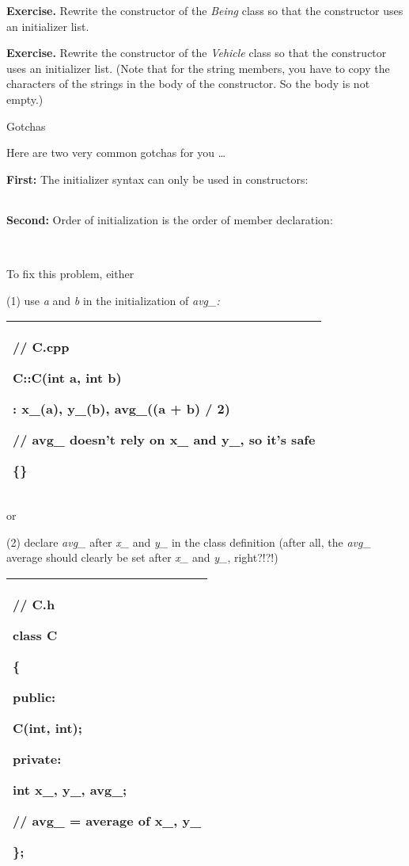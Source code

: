 \documentclass[
]{article}
\begin{document}
\textbf{Exercise.} Rewrite the constructor of the \emph{Being} class so
that the constructor uses an initializer list.

\textbf{Exercise.} Rewrite the constructor of the \emph{Vehicle} class
so that the constructor uses an initializer list. (Note that for the
string members, you have to copy the characters of the strings in the
body of the constructor. So the body is not empty.)

Gotchas

Here are two very common gotchas for you \ldots{}

\textbf{First:} The initializer syntax can only be used in constructors:

\begin{longtable}[]{@{}@{}}
\toprule
\endhead
\bottomrule
\end{longtable}

\textbf{Second:} Order of initialization is the order of member
declaration:

\begin{longtable}[]{@{}@{}}
\toprule
\endhead
\bottomrule
\end{longtable}

\begin{longtable}[]{@{}@{}}
\toprule
\endhead
\bottomrule
\end{longtable}

To fix this problem, either

(1) use \emph{a} and \emph{b} in the initialization of \emph{avg\_:}

\begin{longtable}[]{@{}l@{}}
\toprule
\endhead
\begin{minipage}[t]{0.97\columnwidth}\raggedright
// C.cpp

C::C(int a, int b)

: x\_(a), y\_(b), avg\_((a + b) / 2)

// avg\_ doesn't rely on x\_ and y\_, so it's safe

\{\}\strut
\end{minipage}\tabularnewline
\bottomrule
\end{longtable}

or

(2) declare \emph{avg\_} after \emph{x\_} and \emph{y\_} in the class
definition (after all, the \emph{avg\_} average should clearly be set
after \emph{x\_} and \emph{y\_}, right?!?!)

\begin{longtable}[]{@{}l@{}}
\toprule
\endhead
\begin{minipage}[t]{0.97\columnwidth}\raggedright
// C.h

class C

\{

public:

C(int, int);

private:

int x\_, y\_, avg\_;

// avg\_ = average of x\_, y\_

\};\strut
\end{minipage}\tabularnewline
\bottomrule
\end{longtable}
\end{document}
